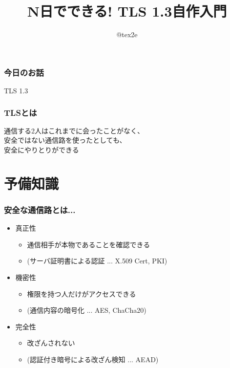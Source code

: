 \documentclass[dvipdfmx, 12pt]{beamer}
\title{N日でできる! TLS 1.3自作入門}
\subtitle{}
\author{@tex2e}
\institute{セキュリティ・キャンプ全国大会2019 LT大会}
\date{}
\begin{document}
\begin{frame}
  \frametitle{}
  \titlepage %
\end{frame}

\begin{frame}
  \frametitle{今日のお話}
  \begin{center}
    \Huge TLS 1.3
  \end{center}
\end{frame}

\begin{frame}
  \frametitle{TLSとは}
  \begin{center}
    \large
    通信する2人はこれまでに\alert{会ったことがなく}、\\[3mm]
    \alert{安全ではない}通信路を使ったとしても、\\[3mm]
    \alert{安全に}やりとりができる
  \end{center}
\end{frame}

\section{予備知識} %

\begin{frame}
  \frametitle{安全な通信路とは...}

  \begin{itemize}
    \item 真正性
      \begin{itemize}
        \item 通信相手が本物であることを確認できる
        \item (サーバ証明書による\alert{認証} ... X.509 Cert, PKI)
      \end{itemize}

    \vspace{0.5em}
    \item 機密性
      \begin{itemize}
        \item 権限を持つ人だけがアクセスできる
        \item (通信内容の\alert{暗号化} ... AES, ChaCha20)
      \end{itemize}

    \vspace{0.5em}
    \item 完全性
      \begin{itemize}
        \item 改ざんされない
        \item (認証付き暗号による\alert{改ざん検知} ... AEAD)
      \end{itemize}
  \end{itemize}
\end{frame}
\end{document}
